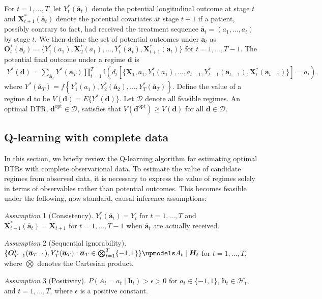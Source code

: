 \documentclass[12pt]{article}
\begin{document}
For $t=1,\ldots,T$, let $Y_t^*(\overline{\bm{a}}_t)$  denote the potential longitudinal outcome at stage $t$ and $\bm{X}_{t+1}^*(\overline{\bm{a}}_t)$  denote the potential covariates at stage $t+1$  if a patient, possibly contrary to fact, had received the treatment sequence $\overline{\bm{a}}_t = (a_1,\ldots,a_t)$  by stage $t$. We then define the set of potential outcomes under $\overline{\bm{a}}_t$ as $\bm{O}_t^*(\overline{\bm{a}}_t) = \{Y_1^*(a_1), \bm{X}_2^*(a_1),\ldots,Y_{t}^*(\overline{\bm{a}}_{t}),\bm{X}_{t+1}^*(\overline{\bm{a}}_{t}) \}$  for $t=1,\ldots,T-1$. The potential final outcome under a regime $\bm{d}$ is
\begin{align*}
Y^*(\bm{d})=\sum_{\overline{\bm{a}}_T} Y^*\left(\overline{\bm{a}}_T\right) \prod_{t=1}^T \mathbb I (d_t\left[\{\bm{X}_1,a_1,Y_1^*(a_1),\ldots,a_{t-1},Y_{t-1}^*(\overline{\bm{a}}_{t-1}),\bm{X}_{t}^*(\overline{\bm{a}}_{t-1})\}\right]=a_t),
\end{align*}
where $Y^*\left(\overline{\bm{a}}_T\right)=f\left\{Y_1^*\left(a_1\right), Y_2^*\left(\overline{\bm{a}}_2\right), \ldots, Y_T^*\left(\overline{\bm{a}}_T\right)\right\}$. 
Define the value of a regime $\bm{d}$ to be $V(\bm{d}) = E\{Y^*(\bm{d})\}$. Let $\mathcal{D}$ denote all feasible regimes. An optimal DTR, $\bm{d}^{\mathrm{opt}}\in \mathcal{D}$, satisfies that $V(\bm{d}^{\mathrm{opt}}) \geq V(\bm{d})$ for all $\bm{d} \in \mathcal{D}$.



\subsection{Q-learning with complete data}

In this section, we briefly review the Q-learning algorithm for estimating optimal DTRs with complete observational data. To estimate the value of candidate regimes from observed data, it is necessary to express the value of regimes solely in terms of observables rather than potential outcomes. This becomes feasible under the following, now standard, causal inference assumptions:
\begin{description}
    \item {\em Assumption} 1 (Consistency). $Y_t^*(\overline{\bm{a}}_t) = Y_t$ for $t = 1,\ldots,T$ and $\bm{X}_{t+1}^*(\overline{\bm{a}}_t) = \bm{X}_{t+1}$ for $t = 1,\ldots,T-1$ when $\overline{\bm{a}}_t$ are actually received.
    \item {\em Assumption} 2 (Sequential ignorability). $\{\bm{O}_{T-1}^*(\overline{\bm{a}}_{T-1}), Y_T^*(\overline{\bm{a}}_T) : \overline{\bm{a}}_T \in \bigotimes_{t=1}^{T} \{-1,1\}\} \upmodels A_t \mid \bm{H}_t$ for $t=1,\ldots,T$, where $\bigotimes$ denotes the Cartesian product.
    \item {\em Assumption} 3 (Positivity). $P(A_t=a_t\mid \bm{h}_t) > \epsilon >0$ for $a_t \in \{-1,1\}$, $\bm{h}_t \in  \mathcal{H}_t$, and $t=1,\ldots,T$, where $\epsilon$ is a positive constant. 
\end{description}
\end{document}
